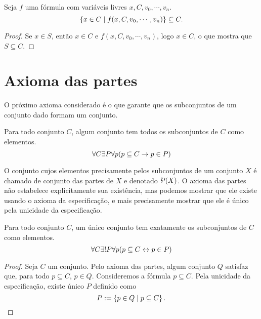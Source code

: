 \begin{proposition}
Seja $f$ uma fórmula com variáveis livres $x,C,v_0,\cdots,v_n$.
	\begin{equation*}
	\left\{{x \in C}\;\middle\vert\;{f(x,C,v_0,\cdots,v_n)}\right\} \subseteq C.
	\end{equation*}
\end{proposition}
\begin{proof}
Se $x \in S$, então $x \in C$ e $f(x,C,v_0,\cdots,v_n)$, logo $x \in C$, o que mostra que $S \subseteq C$.
\end{proof}

\section{Axioma das partes}

O próximo axioma considerado é o que garante que os subconjuntos de um conjunto dado formam um conjunto.

\begin{axiom}[Partes]
Para todo conjunto $C$, algum conjunto tem todos os subconjuntos de $C$ como elementos.
	\begin{equation*}
	\forall C \exists P \forall p (p \subseteq C \rightarrow p \in P)
	\end{equation*}
\end{axiom}

O conjunto cujos elementos precisamente pelos subconjuntos de um conjunto $X$ é chamado de conjunto das partes de $X$ e denotado $\p(X)$. O axioma das partes não estabelece explicitamente sua existência, mas podemos mostrar que ele existe usando o axioma da especificação, e mais precisamente mostrar que ele é único pela unicidade da especificação.

\begin{proposition}
Para todo conjunto $C$, um único conjunto tem exatamente os subconjuntos de $C$ como elementos.
	\begin{equation*}
	\forall C \exists! P \forall p (p \subseteq C \leftrightarrow p \in P)
	\end{equation*}
\end{proposition}
\begin{proof}
Seja $C$ um conjunto. Pelo axioma das partes, algum conjunto $Q$ satisfaz que, para todo $p \subseteq C$, $p \in Q$. Consideremos a fórmula $p \subseteq C$.  Pela unicidade da especificação, existe único $P$ definido como
	\begin{equation*}
	P := \left\{{p \in Q}\;\middle\vert\;{p \subseteq C}\right\}. \qedhere
	\end{equation*}
\end{proof}

